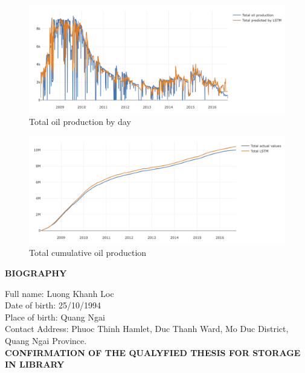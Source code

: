 \documentclass[12pt,a4paper]{report}
\begin{document}
\begin{figure}[H]
  \centering
  \includegraphics[width=\linewidth]{Cumulative/Total}
  \caption{Total oil production by day}
\end{figure}

\begin{figure}[H]
  \centering
  \includegraphics[width=\linewidth]{Cumulative/Totalcum}
  \caption{Total cumulative oil production}
\end{figure}
\newpage
\begin{center}
\textbf{BIOGRAPHY}
\end{center}
Full name: Luong Khanh Loc\\
Date of birth: 25/10/1994 \\
Place of birth: Quang Ngai\\
Contact Address: Phuoc Thinh Hamlet, Duc Thanh Ward, Mo Duc District, Quang Ngai Province.\\

\textbf{CONFIRMATION OF THE QUALYFIED THESIS FOR STORAGE IN LIBRARY}\\
\end{document}

